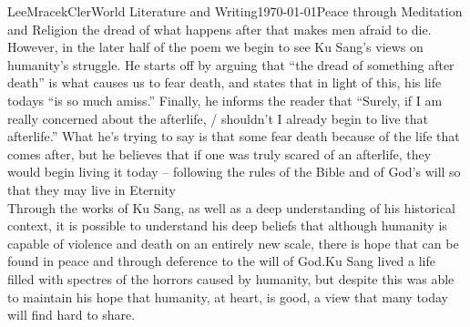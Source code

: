\documentclass[12pt,letterpaper]{article}
\begin{document}
\begin{mla}{Lee}{Mracek}{Cler}{World Literature and Writing}{\today}{Peace through Meditation and Religion}
    the dread of what happens after that makes men afraid to die. However, in the later half of the poem we begin to see Ku Sang's views on humanity's struggle. He starts off by arguing that ``the dread of something after death'' is what causes us to fear death, and states that in light of this, his life todays ``is so much amiss.'' Finally, he informs the reader that ``Surely, if I am really concerned about the afterlife, / shouldn't I already begin to live that afterlife.'' What he's
    trying to say is that some fear death because of the life that comes after, but he believes that if one was truly scared of an afterlife, they would begin living it today -- following the rules of the Bible and of God's will so that they may live in Eternity~\parencite{taize}\\
    Through the works of Ku Sang, as well as a deep understanding of his historical context, it is possible to understand his deep beliefs that although humanity is capable of violence and death on an entirely new scale, there is hope that can be found in peace and through deference to the will of God.Ku Sang lived a life filled with spectres of the horrors caused by humanity, but despite this was able to maintain his hope that humanity, at heart, is good, a view that many today will find hard to share.
    \pagebreak
    \printbibliography
\end{mla}
\end{document}
